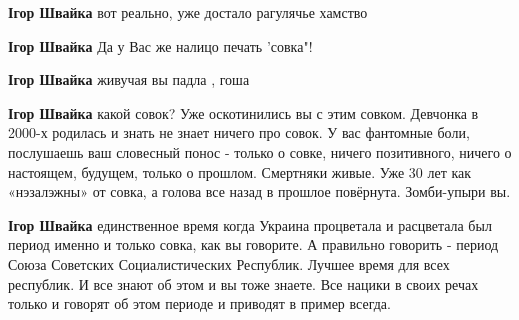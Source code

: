 \begin{itemize}
\begin{itemize}
\textbf{Ігор Швайка} вот реально, уже достало рагулячье хамство

 
\textbf{Ігор Швайка} Да у Вас же налицо печать 'совка"!

 
\textbf{Ігор Швайка} живучая вы падла , гоша

 
\textbf{Ігор Швайка} какой совок? Уже оскотинились вы с этим совком. Девчонка в
2000-х родилась и знать не знает ничего про совок. У вас фантомные боли,
послушаешь ваш словесный понос - только о совке, ничего позитивного, ничего о
настоящем, будущем, только о прошлом. Смертняки живые. Уже 30 лет как
«нэзалэжны» от совка, а голова все назад в прошлое повёрнута. Зомби-упыри вы.

 
\textbf{Ігор Швайка} единственное время когда Украина процветала и расцветала
был период именно и только совка, как вы говорите. А правильно говорить -
период Союза Советских Социалистических Республик. Лучшее время для всех
республик. И все знают об этом и вы тоже знаете. Все нацики в своих речах
только и говорят об этом периоде и приводят в пример всегда.

 

\end{itemize}
\end{itemize}
